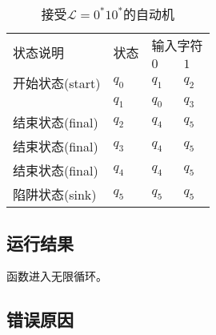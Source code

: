 \begin{table}[!htbp]
    \caption{接受{$\mathcal{L}=0^*10^*$}的自动机{\cite{book1}}}
    \label{tab:DFA4}
    \centering
    \small%
    \setlength{\tabcolsep}{4pt}%
    \renewcommand{\arraystretch}{1.2}%
        \begin{tabular}{l p{3em}<{\centering} p{3em}<{\centering} p{3em}<{\centering}}
        \toprule %
        \multirow{2}{*}{状态说明} & \multirow{2}{*}{状态} & \multicolumn{2}{c}{输入字符} \\
		\cline{3-4}      &    &$0$ & $1$  \\
        \midrule%
        开始状态(start)  & $q_0$ & $q_1$   & $q_2$   \\
                        & $q_1$ & $q_0$   & $q_3$   \\
        结束状态(final) & $q_2$ & $q_4$   & $q_5$   \\
        结束状态(final) & $q_3$ & $q_4$   & $q_5$   \\
        结束状态(final) & $q_4$ & $q_4$   & $q_5$   \\
        陷阱状态(sink) & $q_5$ & $q_5$   & $q_5$   \\
        \bottomrule%
    \end{tabular}
\end{table}

\subsection{运行结果}
函数进入无限循环。

\subsection{错误原因} 

